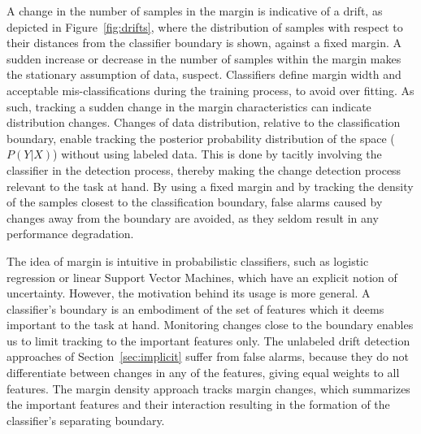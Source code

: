 \documentclass[authoryear,3p,times,twocolumn]{elsarticle}
\begin{document}
A change in the number of samples in the margin is indicative of a drift, as depicted in Figure~\ref{fig:drifts}, where the distribution of samples with respect to their distances from the classifier boundary is shown, against a fixed margin. A sudden increase or decrease in the number of samples within the margin makes the stationary assumption of data, suspect. Classifiers define margin width and acceptable mis-classifications during the training process, to avoid over fitting. As such, tracking a sudden change in the margin characteristics can indicate distribution changes. Changes of data distribution, relative to the classification boundary, enable tracking the posterior probability distribution of the space ($P(Y|X)$) without using labeled data. This is done by tacitly involving the classifier in the detection process, thereby making the change detection process relevant to the task at hand. By using a fixed margin and by tracking the density of the samples closest to the classification boundary, false alarms caused by changes away from the boundary are avoided, as they seldom result in any performance degradation. 

The idea of margin is intuitive in probabilistic classifiers, such as logistic regression or linear Support Vector Machines, which have an explicit notion of uncertainty. However, the motivation behind its usage is more general. A classifier's boundary is an embodiment of the set of features which it deems important to the task at hand. Monitoring changes close to the boundary enables us to limit tracking to the important features only. The unlabeled drift detection approaches of Section~\ref{sec:implicit} suffer from false alarms, because they do not differentiate between changes in any of the features, giving equal weights to all features. The margin density approach tracks margin changes, which summarizes the important features and their interaction resulting in the formation of the classifier's separating boundary. 
\end{document}
